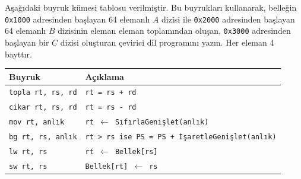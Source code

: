 \begin{alistirma}[\zor]
Aşağıdaki buyruk kümesi tablosu verilmiştir. Bu buyrukları kullanarak, belleğin \texttt{0x1000} adresinden başlayan 64 elemanlı $A$ dizisi ile \texttt{0x2000} adresinden başlayan 64 elemanlı $B$ dizisinin eleman eleman toplamından oluşan, \texttt{0x3000} adresinden başlayan bir $C$ dizisi oluşturan çevirici dil programını yazın. Her eleman 4 bayttır.

\begin{center}
\begin{tabular}{|l|l|}
\hline
\textbf{Buyruk} & \textbf{Açıklama} \\ \hline
\texttt{topla rt, rs, rd} & \texttt{rt = rs + rd} \\ \hline
\texttt{cikar rt, rs, rd} & \texttt{rt = rs - rd} \\ \hline
\texttt{mov rt, anlık} & \texttt{rt $\leftarrow$ SıfırlaGenişlet(anlık)} \\ \hline
\texttt{bg rt, rs, anlık} & \texttt{rt > rs ise PS = PS + İşaretleGenişlet(anlık)} \\ \hline
\texttt{lw rt, rs} & \texttt{rt $\leftarrow$ Bellek[rs]} \\ \hline
\texttt{sw rt, rs} & \texttt{Bellek[rt] $\leftarrow$ rs} \\ \hline
\end{tabular}
\end{center}
\end{alistirma}

